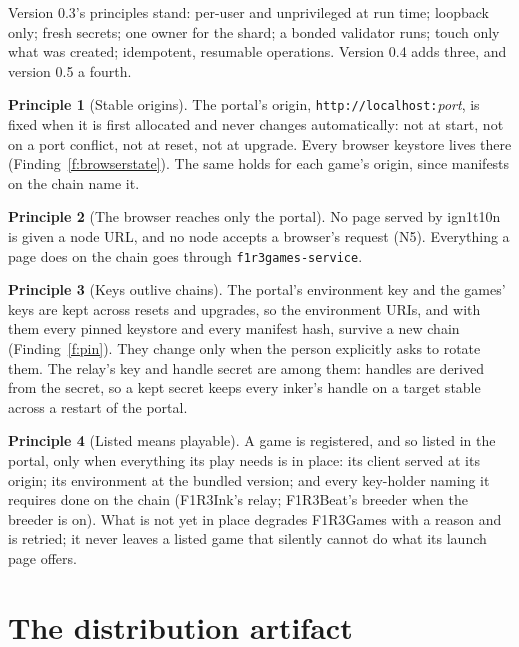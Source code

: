 \documentclass[11pt]{article}
\theoremstyle{definition}
\newtheorem{principle}{Principle}
\theoremstyle{remark}
\newcommand{\code}[1]{\texttt{#1}}
\newcommand{\Hr}{ign1t10n}
\newcommand{\Gm}{F1R3Games}
\newcommand{\Svc}{\code{f1r3games-service}}
\begin{document}
Version 0.3's principles stand: per-user and unprivileged at run time; loopback
only; fresh secrets; one owner for the shard; a bonded validator runs; touch only
what was created; idempotent, resumable operations. Version 0.4 adds three, and
version 0.5 a fourth.

\begin{principle}[Stable origins]\label{p:origin}
The portal's origin, \code{http://localhost:}\textit{port}, is fixed when it is first
allocated and never changes automatically: not at start, not on a port conflict, not
at reset, not at upgrade. Every browser keystore lives there (Finding~\ref{f:browserstate}).
The same holds for each game's origin, since manifests on the chain name it.
\end{principle}

\begin{principle}[The browser reaches only the portal]\label{p:nonode}
No page served by \Hr{} is given a node URL, and no node accepts a browser's request
(N5). Everything a page does on the chain goes through \Svc{}.
\end{principle}

\begin{principle}[Keys outlive chains]\label{p:keys}
The portal's environment key and the games' keys are kept across resets and
upgrades, so the environment URIs, and with them every pinned keystore and every
manifest hash, survive a new chain (Finding~\ref{f:pin}). They change only when the
person explicitly asks to rotate them. The relay's key and handle secret are among
them: handles are derived from the secret, so a kept secret keeps every inker's
handle on a target stable across a restart of the portal.
\end{principle}

\begin{principle}[Listed means playable]\label{p:playable}
A game is registered, and so listed in the portal, only when everything its play
needs is in place: its client served at its origin; its environment at the bundled
version; and every key-holder naming it requires done on the chain (F1R3Ink's relay;
F1R3Beat's breeder when the breeder is on). What is not yet in place degrades
\Gm{} with a reason and is retried; it never leaves a listed game that silently
cannot do what its launch page offers.
\end{principle}

\section{The distribution artifact}\label{sec:artifact}
\end{document}

